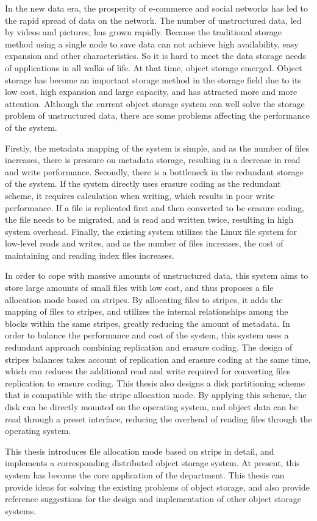 \begin{abstract*}
In the new data era, the prosperity of e-commerce and social networks has led to the rapid spread of data on the network. The number of unstructured data, led by videos and pictures, has grown rapidly. Because the traditional storage method using a single node to save data can not achieve high availability, easy expansion and other characteristics. So it is hard to meet the data storage needs of applications in all walks of life. At that time, object storage emerged. Object storage has become an important storage method in the storage field due to its low cost, high expansion and large capacity, and has attracted more and more attention. Although the current object storage system can well solve the storage problem of unstructured data, there are some problems affecting the performance of the system.

Firstly, the metadata mapping of the system is simple, and as the number of files increases, there is pressure on metadata storage, resulting in a decrease in read and write performance. Secondly, there is a bottleneck in the redundant storage of the system. If the system directly uses erasure coding as the redundant scheme, it requires calculation when writing, which results in poor write performance. If a file is replicated first and then converted to be erasure coding, the file needs to be migrated, and is read and written twice, resulting in high system overhead. Finally, the existing system utilizes the Linux file system for low-level reads and writes, and as the number of files increases, the cost of maintaining and reading index files increases.

In order to cope with massive amounts of unstructured data, this system aims to store large amounts of small files with low cost, and thus proposes a file allocation mode based on stripes. By allocating files to stripes, it adds the mapping of files to stripes, and utilizes the internal relationships among the blocks within the same stripes, greatly reducing the amount of metadata. In order to balance the performance and cost of the system, this system uses a redundant approach combining replication and erasure coding. The design of stripes balances takes account of replication and erasure coding at the same time, which can reduces the additional read and write required for converting files replication to erasure coding. This thesis also designs a disk partitioning scheme that is compatible with the stripe allocation mode. By applying this scheme, the disk can be directly mounted on the operating system, and object data can be read through a preset interface, reducing the overhead of reading files through the operating system.

This thesis introduces file allocation mode based on strips in detail, and implements a corresponding distributed object storage system. At present, this system has become the core application of the department. This thesis can provide ideas for solving the existing problems of object storage, and also provide reference suggestions for the design and implementation of other object storage systems.


\end{abstract*}
